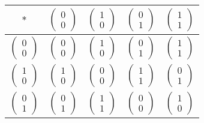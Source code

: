 \begin{tabular}{ c | c c c c }
	$*$		&$\begin{pmatrix}0\\0\end{pmatrix}$	&$\begin{pmatrix}1\\0\end{pmatrix}$		&$\begin{pmatrix}0\\1\end{pmatrix}$	&$\begin{pmatrix}1\\1\end{pmatrix}$	\\ \hline
	$\begin{pmatrix}0\\0\end{pmatrix}$		&$\begin{pmatrix}0\\0\end{pmatrix}$	&$\begin{pmatrix}1\\0\end{pmatrix}$		&$\begin{pmatrix}0\\1\end{pmatrix}$	&$\begin{pmatrix}1\\1\end{pmatrix}$	\\
	$\begin{pmatrix}1\\0\end{pmatrix}$		&$\begin{pmatrix}1\\0\end{pmatrix}$	&$\begin{pmatrix}0\\0\end{pmatrix}$	&$\begin{pmatrix}1\\1\end{pmatrix}$	&$\begin{pmatrix}0\\1\end{pmatrix}$	\\
	$\begin{pmatrix}0\\1\end{pmatrix}$		&$\begin{pmatrix}0\\1\end{pmatrix}$	&$\begin{pmatrix}1\\1\end{pmatrix}$		&$\begin{pmatrix}0\\0\end{pmatrix}$	&$\begin{pmatrix}1\\0\end{pmatrix}$	\\

\end{tabular}
